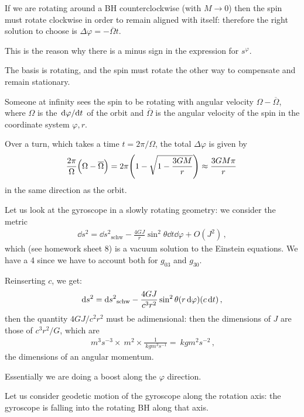 \documentclass[main.tex]{subfiles}
\begin{document}
If we are rotating around a BH counterclockwise (with \(M \rightarrow 0\)) then the spin must rotate clockwise in order to remain aligned with itself: therefore the right solution to choose is \(\Delta \varphi = - \overline{\Omega} t\). 

This is the reason why there is a minus sign in the expression for \(s^{\varphi } \). 

The basis is rotating, and the spin must rotate the other way to compensate and remain stationary. 

Someone at infinity sees the spin to be rotating with angular velocity \(\Omega - \overline{\Omega}\), where \(\Omega \) is the \(\dv*{\varphi }{t}\) of the orbit and \(\overline{\Omega}\) is the angular velocity of the spin in the coordinate system \(\varphi , r\). 

Over a turn, which takes a time \(t = 2 \pi / \Omega \), the total \(\Delta \varphi \) is given by 
%
\begin{align}
  \frac{2\pi}{\Omega } \qty( \Omega - \overline{\Omega})
  = 2 \pi \qty(1 - \sqrt{1 - \frac{3GM}{r}})
  \approx \frac{3GM\pi}{r} 
\,
\end{align}
%
in the same direction as the orbit. 

Let us look at the gyroscope in a slowly rotating geometry: we consider the metric 
%
\begin{align}
  \dd{s^2} = \dd{s^2}_{\text{schw}} - \frac{4 GJ}{r} \sin^2 \theta \dd{t} \dd{\varphi } + O(J^2)
\,,
\end{align}
%
which (see homework sheet 8) is a vacuum solution to the Einstein equations. We have a 4 since we have to account both for \(g_{03} \) and \(g_{30} \). 

Reinserting  \(c\), we get: 
%
\begin{align}
  \dd{s^2} = \dd{s^2}_{\text{schw}} - \frac{4GJ}{c^3r^2} \sin^2\theta \qty(r \dd{\varphi }) \qty(c \dd{t})
\,,
\end{align}
%
then the quantity \(4GJ / c^2 r^2\) must be adimensional: then the dimensions of \(J\) are those of \(c^3 r^2 / G\), which are 
%
\begin{align}
  \SI{}{m^3 s^{-3}} \times \SI{}{m^2} \times \frac{1}{\SI{}{kg m^3 s^{-1}}} = \SI{}{kg m^2 s^{-2}} 
\,,
\end{align}
%
the dimensions of an angular momentum. 

Essentially we are doing a boost along the \(\varphi \) direction. 

Let us consider geodetic motion of the gyroscope along the rotation axis: the gyroscope is falling into the rotating BH along that axis. 
\end{document}
